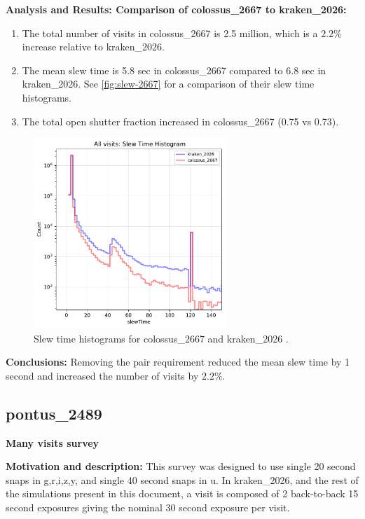 \documentclass[DM,authoryear,toc]{lsstdoc}
\begin{document}
\textbf{Analysis and Results: Comparison of colossus\_2667 to kraken\_2026:}

\begin{enumerate}
\item The total number of visits in colossus\_2667 is 2.5 million, which is a $2.2\%$ increase relative to kraken\_2026.
\item The mean slew time is 5.8 sec in colossus\_2667 compared to 6.8 sec in kraken\_2026.
See \autoref{fig:slew-2667} for a comparison of their slew time histograms.
\item The total open shutter fraction increased in colossus\_2667 (0.75 vs 0.73).
\end{enumerate}

\begin{figure}[ht]
\centering
\includegraphics[width=0.65\textwidth]{figures/kraken_2026_colossus_2667_Slew_Time_Histogram_All_visits_ONED_ComboBinnedData.pdf}
\caption{Slew time histograms for colossus\_2667 and kraken\_2026 .}
\label{fig:slew-2667}
\end{figure}

\textbf{Conclusions:} Removing the pair requirement reduced the mean slew time by 1 second and increased the number of
visits by $2.2\%$.

\subsection{pontus\_2489} \label{pontus2489}

\textbf{Many visits survey}

\textbf{Motivation and description:} This survey was designed to use single 20 second snaps in
g,r,i,z,y, and single 40 second snaps in u. In kraken\_2026, and the rest of the simulations present in this document,
a visit is composed of 2 back-to-back 15 second exposures giving the nominal 30 second exposure per visit.
\end{document}
